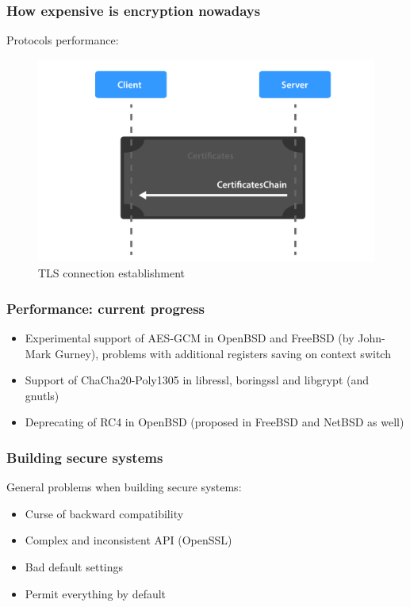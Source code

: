 \documentclass[11pt,t]{beamer}
\newcommand{\cipher}[1]{
	{\color{blue!30} #1}
}
\begin{document}
\begin{frame}[fragile]
\frametitle{How expensive is encryption nowadays}
Protocols performance:
\begin{figure}[H]
\centering
\includegraphics[height=0.6\textheight]{tls.pdf}
\caption{TLS connection establishment}
\end{figure}
\end{frame}

\begin{frame}
\frametitle{Performance: current progress}
\begin{itemize}
\item<1-> Experimental support of \cipher{AES-GCM} in OpenBSD and FreeBSD (by John-Mark 
Gurney), problems with additional registers saving on context switch
\item<2-> Support of \cipher{ChaCha20-Poly1305} in libressl, boringssl and libgrypt (and 
gnutls)
\item<3-> Deprecating of \cipher{RC4} in OpenBSD (proposed in FreeBSD and NetBSD as well)
\end{itemize}
\end{frame}

\begin{frame}
\frametitle{Building secure systems}
General problems when building secure systems:
\begin{itemize}
\item<1-> Curse of backward compatibility
\item<2-> Complex and inconsistent API (OpenSSL)
\item<3-> Bad default settings
\item<3-> Permit everything by default
\end{itemize}
\end{frame}
\end{document}
